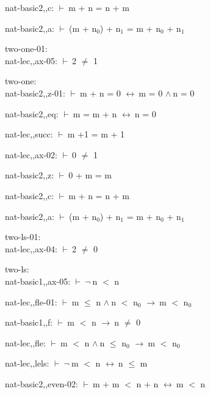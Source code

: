 \documentclass[a4paper]{article}
\newcommand{\Fol}{\mbox{$\vdash\ $}}
\newcommand{\Not}{\mbox{$\neg\ $}}
\newcommand{\And}{\mbox{$\wedge\ $}}
\newcommand{\Imp}{\mbox{$\rightarrow\ $}}
\newcommand{\Equiv}{\mbox{$\leftrightarrow\ $}}
\begin{document}
nat-basic2,,c: 
 \Fol m + n = n + m



nat-basic2,,a: 
 \Fol (m + $\mbox{n}_{0}$) + $\mbox{n}_{1}$ = m + $\mbox{n}_{0}$ + $\mbox{n}_{1}$



\bigskip

two-one-01:\\ nat-lec,,ax-05: 
 \Fol 2 $\neq$ 1



\bigskip

two-one:\\ nat-basic2,,z-01: 
 \Fol m + n = 0 \Equiv m = 0 \And n = 0



nat-basic2,,eq: 
 \Fol m = m + n \Equiv n = 0



nat-lec,,succ: 
 \Fol m +1 = m + 1



nat-lec,,ax-02: 
 \Fol 0 $\neq$ 1



nat-basic2,,z: 
 \Fol 0 + m = m



nat-basic2,,c: 
 \Fol m + n = n + m



nat-basic2,,a: 
 \Fol (m + $\mbox{n}_{0}$) + $\mbox{n}_{1}$ = m + $\mbox{n}_{0}$ + $\mbox{n}_{1}$



\bigskip

two-ls-01:\\ nat-lec,,ax-04: 
 \Fol 2 $\neq$ 0



\bigskip

two-ls:\\ nat-basic1,,ax-05: 
 \Fol \Not n $<$ n



nat-lec,,fle-01: 
 \Fol m $\le$ n \And n $<$ $\mbox{n}_{0}$ \Imp m $<$ $\mbox{n}_{0}$



nat-basic1,,f: 
 \Fol m $<$ n \Imp n $\neq$ 0



nat-lec,,fle: 
 \Fol m $<$ n \And n $\le$ $\mbox{n}_{0}$ \Imp m $<$ $\mbox{n}_{0}$



nat-lec,,lels: 
 \Fol \Not m $<$ n \Equiv n $\le$ m



nat-basic2,,even-02: 
 \Fol m + m $<$ n + n \Equiv m $<$ n
\end{document}
